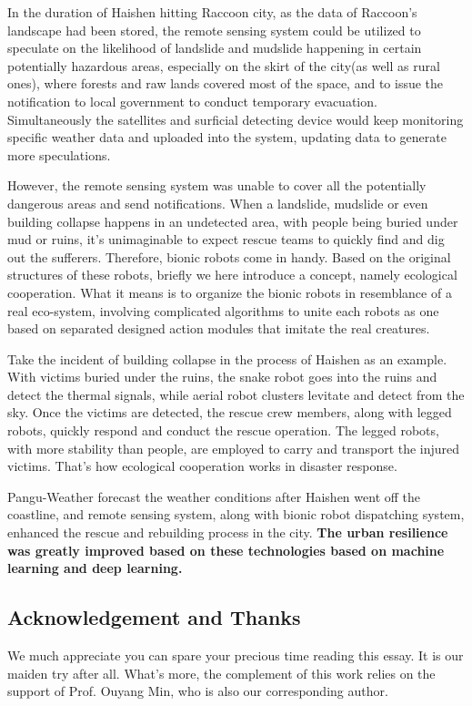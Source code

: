 \documentclass[conference]{IEEEtran}
\begin{document}
In the duration of Haishen hitting Raccoon city, as the data of Raccoon's landscape had been stored, the remote sensing system could be utilized to speculate on the likelihood of landslide and mudslide happening in certain potentially hazardous areas, especially on the skirt of the city(as well as rural ones), where forests and raw lands covered most of the space, and to issue the notification to local government to conduct temporary evacuation. Simultaneously the satellites and surficial detecting device would keep monitoring specific weather data and uploaded into the system, updating data to generate more speculations.

However, the remote sensing system was unable to cover all the potentially dangerous areas and send notifications. When a landslide, mudslide or even building collapse happens in an undetected area, with people being buried under mud or ruins, it's unimaginable to expect rescue teams to quickly find and dig out the sufferers. Therefore, bionic robots come in handy. Based on the original structures of these robots, briefly we here introduce a concept, namely ecological cooperation. What it means is to organize the bionic robots in resemblance of a real eco-system, involving complicated algorithms to unite each robots as one based on separated designed action modules that imitate the real creatures.

Take the incident of building collapse in the process of Haishen as an example. With victims buried under the ruins, the snake robot goes into the ruins and detect the thermal signals, while aerial robot clusters levitate and detect from the sky. Once the victims are detected, the rescue crew members, along with legged robots, quickly respond and conduct the rescue operation. The legged robots, with more stability than people, are employed to carry and transport the injured victims. That's how ecological cooperation works in disaster response.

Pangu-Weather forecast the weather conditions after Haishen went off the coastline, and remote sensing system, along with bionic robot dispatching system, enhanced the rescue and rebuilding process in the city. \textbf{The urban resilience was greatly improved based on these technologies based on machine learning and deep learning.}

\subsection{Acknowledgement and Thanks}
We much appreciate you can spare your precious time reading this essay. It is our maiden try after all. What's more, the complement of this work relies on the support of Prof. Ouyang Min, who is also our corresponding author. 
\end{document}
